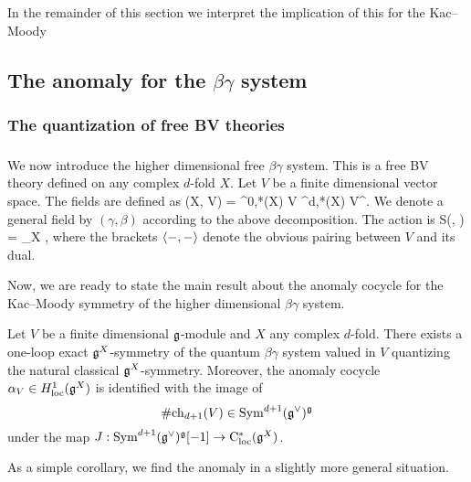 In the remainder of this section we interpret the implication of this for the Kac--Moody 

\subsection{The anomaly for the $\beta\gamma$ system}

\subsubsection{The quantization of free BV theories}


\subsubsection{}

We now introduce the higher dimensional free $\beta\gamma$ system. 
This is a free BV theory defined on any complex $d$-fold $X$.
Let $V$ be a finite dimensional vector space. 
The fields are defined as 
\ben
\sE(X, V) = \Omega^{0,*}(X) \tensor V \oplus \Omega^{d,*}(X) \tensor V^\vee [d-1] .
\een 
We denote a general field by $(\gamma, \beta)$ according to the above decomposition. 
The action is 
\ben
S(\gamma, \beta) = \int_X \<\beta, \dbar \gamma\>
\een
where the brackets $\langle-,-\rangle$ denote the obvious pairing between $V$ and its dual. 


Now, we are ready to state the main result about the anomaly cocycle for the Kac--Moody symmetry of the higher dimensional $\beta\gamma$ system.


\begin{thm} Let $V$ be a finite dimensional $\mathfrak g$-module and $X$ any complex $d$-fold.
There exists a one-loop exact $\mathfrak g^X$-symmetry of the quantum $\beta\gamma$ system valued in $V$ quantizing the natural classical $\mathfrak g^X$-symmetry.
Moreover, the anomaly cocycle $\alpha_V \in H^1_{\rm loc}(\mathfrak g^X)$ is identified with the image of $$\#{\rm ch}_{d+1}(V) \in {\rm Sym}^{d+1}(\mathfrak g^\vee)^\mathfrak g$$ under the map $J : {\rm Sym}^{d+1}(\mathfrak g^\vee)^\mathfrak g [-1] \to {\rm C}_{\rm loc}^*(\mathfrak g^X)$. 
\end{thm}

As a simple corollary, we find the anomaly in a slightly more general situation.

